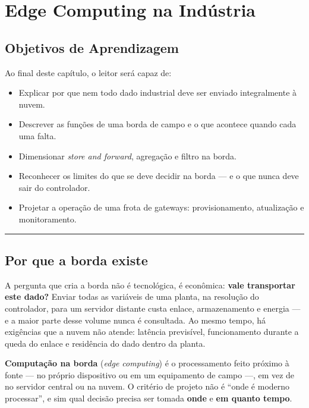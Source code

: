 \chapter{Edge Computing na Indústria}\label{edge-computing-na-induxfastria}

\section*{Objetivos de Aprendizagem}

Ao final deste capítulo, o leitor será capaz de:

\begin{itemize}
\tightlist
\item
  Explicar por que nem todo dado industrial deve ser enviado integralmente à nuvem.
\item
  Descrever as funções de uma borda de campo e o que acontece quando cada uma falta.
\item
  Dimensionar \emph{store and forward}, agregação e filtro na borda.
\item
  Reconhecer os limites do que se deve decidir na borda --- e o que nunca deve sair do controlador.
\item
  Projetar a operação de uma frota de gateways: provisionamento, atualização e monitoramento.
\end{itemize}

\begin{center}\rule{0.5\linewidth}{0.5pt}\end{center}

\section{Por que a borda existe}\label{por-que-a-borda-existe}

A pergunta que cria a borda não é tecnológica, é econômica: \textbf{vale transportar este dado?} Enviar
todas as variáveis de uma planta, na resolução do controlador, para um servidor distante custa
enlace, armazenamento e energia --- e a maior parte desse volume nunca é consultada. Ao mesmo tempo,
há exigências que a nuvem não atende: latência previsível, funcionamento durante a queda do enlace e
residência do dado dentro da planta.

\textbf{Computação na borda} (\emph{edge computing}) é o processamento feito próximo à fonte --- no próprio
dispositivo ou em um equipamento de campo ---, em vez de no servidor central ou na nuvem. O critério
de projeto não é ``onde é moderno processar'', e sim qual decisão precisa ser tomada \textbf{onde} e \textbf{em
quanto tempo}.

